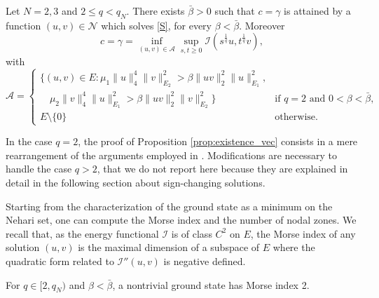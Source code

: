 \documentclass[reqno]{amsart}
\begin{document}
\begin{proposition}\label{prop:existence_vec}
Let $N=2,3$ and $2\le q<q_N$. There exists $\bar\beta>0$ such that
$c=\gamma$  is attained by a function $(u,v)\in\mathcal N$ which solves \eqref{S},
for every  $\beta<\bar \beta$.
Moreover
\[
c=\gamma=\inf_{(u,v)\in \mathcal A }  \sup_{s,t\ge 0}
\mathcal I (s^{\frac{1}q}u, t^{\frac{1}q}v),
\]
with
\[
 \mathcal A = \begin{cases}
\big\{ (u,v) \in E  :  \mu_1 \|u\|_{4}^4 \|v\|_{E_2}^2 > \beta \|uv\|_2^2 \|u\|_{E_1}^2 ,\\
 \quad   \mu_2 \|v\|_{4}^4 \|u\|_{E_1}^2 > \beta \|uv\|_2^2 \|v\|_{E_2}^2 \big\}
& \text{if $q=2$ and $0<\beta<\bar\beta$},
\\[3pt]
E\setminus\{0\} & \text{otherwise.}
\end{cases}
 \]
\end{proposition}

In the case $q=2$, the proof of Proposition \ref{prop:existence_vec} consists in
a mere rearrangement of the arguments employed in \cite[Section 2]{LW_AIHP05}.
Modifications are necessary to handle the case $q>2$, that we do not report here
because they are explained in detail in the following section about sign-changing
solutions.

Starting from the  characterization of the ground state as a minimum on the Nehari set,
one can compute the Morse index and  the number of nodal zones.
We recall that, as the energy functional $\mathcal I$ is of class $C^2$ on $E$,
the Morse index of any solution $(u,v)$ is the maximal dimension of a subspace of
$E$ where the quadratic form related to $ \mathcal{I}''(u,v)$
is negative defined.

\begin{proposition}\label{prop:Morse_vec}
For $q\in [2,q_N)$ and $\beta <\bar\beta $, a nontrivial ground state has Morse
index 2.
\end{proposition}
\end{document}

